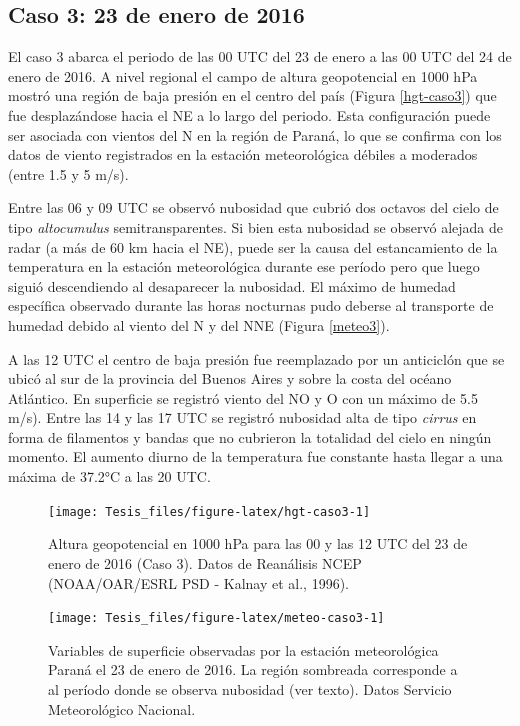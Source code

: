 \documentclass[12pt,spanish,oneside]{book}
\begin{document}
\subsection{Caso 3: 23 de enero de
2016}\label{caso-3-23-de-enero-de-2016}

El caso 3 abarca el periodo de las 00 UTC del 23 de enero a las 00 UTC
del 24 de enero de 2016. A nivel regional el campo de altura
geopotencial en 1000 hPa mostró una región de baja presión en el centro
del país (Figura \ref{hgt-caso3}) que fue desplazándose hacia el NE a lo
largo del periodo. Esta configuración puede ser asociada con vientos del
N en la región de Paraná, lo que se confirma con los datos de viento
registrados en la estación meteorológica débiles a moderados (entre 1.5
y 5 m/s).

Entre las 06 y 09 UTC se observó nubosidad que cubrió dos octavos del
cielo de tipo \emph{altocumulus} semitransparentes. Si bien esta
nubosidad se observó alejada de radar (a más de 60 km hacia el NE),
puede ser la causa del estancamiento de la temperatura en la estación
meteorológica durante ese período pero que luego siguió descendiendo al
desaparecer la nubosidad. El máximo de humedad específica observado
durante las horas nocturnas pudo deberse al transporte de humedad debido
al viento del N y del NNE (Figura \ref{meteo3}).

A las 12 UTC el centro de baja presión fue reemplazado por un anticiclón
que se ubicó al sur de la provincia del Buenos Aires y sobre la costa
del océano Atlántico. En superficie se registró viento del NO y O con un
máximo de 5.5 m/s). Entre las 14 y las 17 UTC se registró nubosidad alta
de tipo \emph{cirrus} en forma de filamentos y bandas que no cubrieron
la totalidad del cielo en ningún momento. El aumento diurno de la
temperatura fue constante hasta llegar a una máxima de 37.2°C a las 20
UTC.

\begin{figure}

{\centering \texttt{[image: Tesis\_files/figure-latex/hgt-caso3-1]} 

}

\caption{Altura geopotencial en 1000 hPa para las 00 y las 12 UTC del 23 de enero de 2016 (Caso 3). Datos de Reanálisis NCEP (NOAA/OAR/ESRL PSD - Kalnay et al., 1996). \label{hgt-caso3}}\label{fig:hgt-caso3}
\end{figure}

\begin{figure}

{\centering \texttt{[image: Tesis\_files/figure-latex/meteo-caso3-1]} 

}

\caption{Variables de superficie observadas por la estación meteorológica Paraná el 23 de enero de 2016. La región sombreada corresponde a al período donde se observa nubosidad (ver texto). Datos Servicio Meteorológico Nacional. \label{meteo3}}\label{fig:meteo-caso3}
\end{figure}
\end{document}
